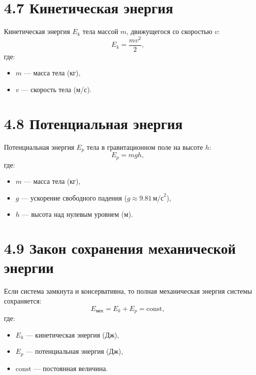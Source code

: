 \documentclass[a4paper,12pt]{article}
\begin{document}
\section*{4.7 Кинетическая энергия}
Кинетическая энергия \(E_k\) тела массой \(m\), движущегося со скоростью \(v\):
\vspace{-0.3em}
$$E_k = \frac{m v^2}{2},$$
где:
\begin{itemize}[itemsep=0pt, topsep=0pt, parsep=0pt]
  \setlength\itemsep{0em}
  \item \(m\) — масса тела (кг),
  \item \(v\) — скорость тела (м/с).
\end{itemize}


\section*{4.8 Потенциальная энергия}
Потенциальная энергия \(E_p\) тела в гравитационном поле на высоте \(h\):
\vspace{-0.3em}
$$E_p = m g h,$$
где:
\begin{itemize}[itemsep=0pt, topsep=0pt, parsep=0pt]
  \setlength\itemsep{0em}
  \item \(m\) — масса тела (кг),
  \item \(g\) — ускорение свободного падения (\(g \approx 9.81 \, \text{м/с}^2\)),
  \item \(h\) — высота над нулевым уровнем (м).
\end{itemize}


\section*{4.9 Закон сохранения механической энергии}
Если система замкнута и консервативна, то полная механическая энергия системы сохраняется:
\vspace{-0.3em}
$$E_{\text{мех}} = E_k + E_p = \text{const},$$
\vspace{-0.3em}
где:
\begin{itemize}[itemsep=0pt, topsep=0pt, parsep=0pt]
  \setlength\itemsep{0em}
  \item \(E_k\) — кинетическая энергия (Дж),
  \item \(E_p\) — потенциальная энергия (Дж),
  \item \(\text{const}\) — постоянная величина.
\end{itemize}
\end{document}
